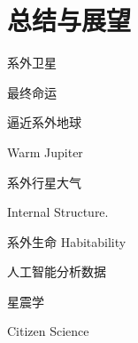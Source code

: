 \chapter{总结与展望}

系外卫星




最终命运

逼近系外地球

Warm Jupiter

系外行星大气

Internal Structure.

系外生命 Habitability

人工智能分析数据

星震学

Citizen Science

